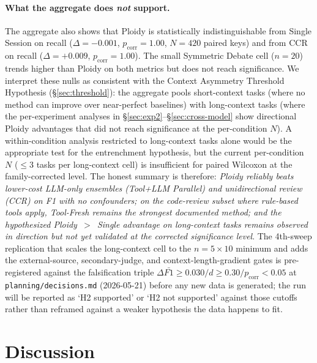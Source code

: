 \documentclass[11pt]{article}
\begin{document}
\paragraph{What the aggregate does \emph{not} support.} The aggregate also shows that Ploidy is statistically indistinguishable from Single Session on recall ($\Delta = -0.001$, $p_\text{corr} = 1.00$, $N = 420$ paired keys) and from CCR on recall ($\Delta = +0.009$, $p_\text{corr} = 1.00$). The small Symmetric Debate cell ($n = 20$) trends higher than Ploidy on both metrics but does not reach significance. We interpret these nulls as consistent with the Context Asymmetry Threshold Hypothesis (\S\ref{sec:threshold}): the aggregate pools short-context tasks (where no method can improve over near-perfect baselines) with long-context tasks (where the per-experiment analyses in \S\ref{sec:exp2}--\S\ref{sec:cross-model} show directional Ploidy advantages that did not reach significance at the per-condition $N$). A within-condition analysis restricted to long-context tasks alone would be the appropriate test for the entrenchment hypothesis, but the current per-condition $N$ ($\leq$3 tasks per long-context cell) is insufficient for paired Wilcoxon at the family-corrected level. The honest summary is therefore: \emph{Ploidy reliably beats lower-cost LLM-only ensembles (Tool+LLM Parallel) and unidirectional review (CCR) on F1 with no confounders; on the code-review subset where rule-based tools apply, Tool-Fresh remains the strongest documented method; and the hypothesized Ploidy~$>$~Single advantage on long-context tasks remains observed in direction but not yet validated at the corrected significance level}. The 4th-sweep replication that scales the long-context cell to the $n{=}5 \times 10$ minimum and adds the external-source, secondary-judge, and context-length-gradient gates is pre-registered against the falsification triple $\Delta \bar{F1} \geq 0.030 / d \geq 0.30 / p_\text{corr} < 0.05$ at \texttt{planning/decisions.md} (2026-05-21) before any new data is generated; the run will be reported as `H2 supported' or `H2 not supported' against those cutoffs rather than reframed against a weaker hypothesis the data happens to fit.

\section{Discussion}
\label{sec:discussion}
\end{document}
